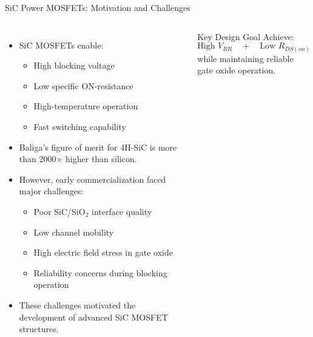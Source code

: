 \begin{frame}{SiC Power MOSFETs: Motivation and Challenges}
\begin{columns}[T]


\begin{itemize}
    \item SiC MOSFETs enable:
    \begin{itemize}
        \item High blocking voltage
        \item Low specific ON-resistance
        \item High-temperature operation
        \item Fast switching capability
    \end{itemize}

    \item Baliga's figure of merit for 4H-SiC is more than 2000$\times$ higher than silicon.

    \item However, early commercialization faced major challenges:
    \begin{itemize}
        \item Poor SiC/SiO$_2$ interface quality
        \item Low channel mobility
        \item High electric field stress in gate oxide
        \item Reliability concerns during blocking operation
    \end{itemize}

    \item These challenges motivated the development of advanced SiC MOSFET structures.
\end{itemize}


\begin{block}{Key Design Goal}
\small
Achieve:
\[
\text{High } V_{BR}
\quad + \quad
\text{Low } R_{DS(on)}
\]
while maintaining reliable gate oxide operation.
\end{block}

\end{columns}
\end{frame}



